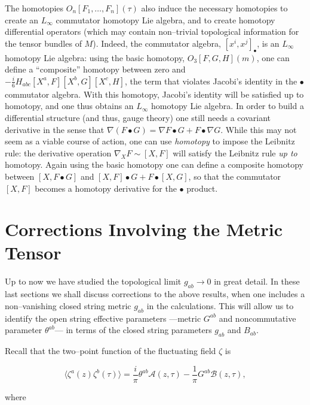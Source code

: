 \documentclass[a4paper,11pt]{article}
\begin{document}
The homotopies $O_{n}[F_{1}, \ldots, F_{n}](\tau)$ also induce
the necessary homotopies to create an $L_{\infty}$ commutator homotopy Lie
algebra, and to create homotopy differential operators (which may contain 
non--trivial topological information for the tensor bundles of $M$). 
Indeed, the commutator algebra, $[x^{i}, x^{j}]_{\bullet}$, 
is an $L_{\infty}$ homotopy Lie algebra: using the basic homotopy, $O_{3} 
[F,G,H](m)$, one can define a ``composite'' homotopy between zero and  
$-\frac{i}{6} H_{abc} [X^{a},F] [X^{b},G] [X^{c},H]$, the term that violates 
Jacobi's identity in the $\bullet$ commutator algebra. With this 
homotopy, Jacobi's identity will be satisfied up to homotopy, and one thus 
obtains an $L_{\infty}$ homotopy Lie algebra. In order to build a differential 
structure (and thus, gauge theory) one still needs a covariant derivative in 
the sense that $\nabla \left( F \bullet G \right) = \nabla F \bullet G + F 
\bullet \nabla G$. While this may not seem as a viable course of action, one 
can use \textit{homotopy} to impose the Leibnitz rule: the derivative 
operation $\nabla_{X} F \sim [ X, F ]$ will satisfy the Leibnitz rule 
\textit{up to} homotopy. Again using the basic homotopy one can define a 
composite homotopy between $[ X, F \bullet G ]$ and $[X,F] \bullet G + F 
\bullet [X,G]$, so that the commutator $[X,F]$ becomes a homotopy derivative 
for the $\bullet$ product.
 

\section{Corrections Involving the Metric Tensor}


Up to now we have studied the topological limit $g_{ab}\rightarrow 0$ in
great detail. In these last sections we shall discuss corrections to the
above results, when one includes a non--vanishing closed string metric
$g_{ab}$ in the calculations. This will allow us to identify the open
string effective parameters ---metric $G^{ab}$ and noncommutative parameter
$\theta^{ab}$--- in terms of the closed string parameters $g_{ab}$ and
$B_{ab}$.

Recall that the two--point function of the fluctuating field $\zeta$ is

$$
\langle \zeta^{a} \left( z \right) \zeta^{b} \left( \tau \right) \rangle = 
\frac{i}{\pi} \theta^{ab} \mathcal{A} \left( z,\tau \right) - \frac{1}{\pi}
G^{ab} \mathcal{B} \left( z,\tau \right),
$$

\noindent 
where
\end{document}
